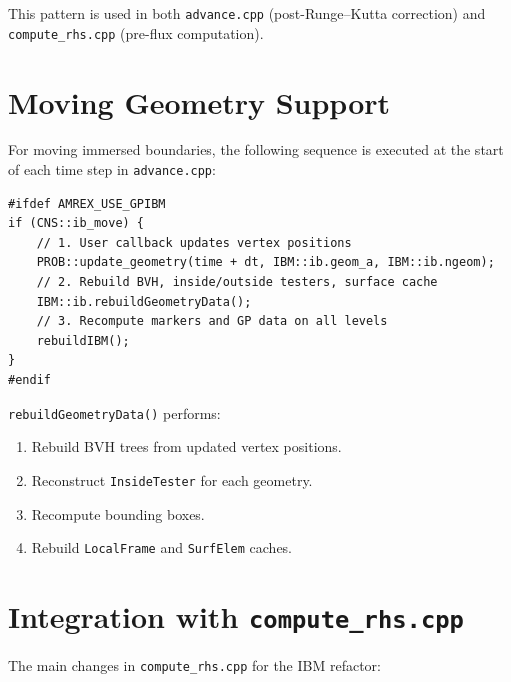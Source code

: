 \documentclass[11pt,a4paper]{article}
\begin{document}
This pattern is used in both \texttt{advance.cpp} (post-Runge--Kutta
correction) and \texttt{compute\_rhs.cpp} (pre-flux computation).

\section{Moving Geometry Support}

For moving immersed boundaries, the following sequence is executed at the
start of each time step in \texttt{advance.cpp}:

\begin{lstlisting}[caption={Moving geometry update sequence}]
#ifdef AMREX_USE_GPIBM
if (CNS::ib_move) {
    // 1. User callback updates vertex positions
    PROB::update_geometry(time + dt, IBM::ib.geom_a, IBM::ib.ngeom);
    // 2. Rebuild BVH, inside/outside testers, surface cache
    IBM::ib.rebuildGeometryData();
    // 3. Recompute markers and GP data on all levels
    rebuildIBM();
}
#endif
\end{lstlisting}

\texttt{rebuildGeometryData()} performs:
\begin{enumerate}
  \item Rebuild BVH trees from updated vertex positions.
  \item Reconstruct \texttt{InsideTester} for each geometry.
  \item Recompute bounding boxes.
  \item Rebuild \texttt{LocalFrame} and \texttt{SurfElem} caches.
\end{enumerate}

\section{Integration with \texttt{compute\_rhs.cpp}}

The main changes in \texttt{compute\_rhs.cpp} for the IBM refactor:
\end{document}
